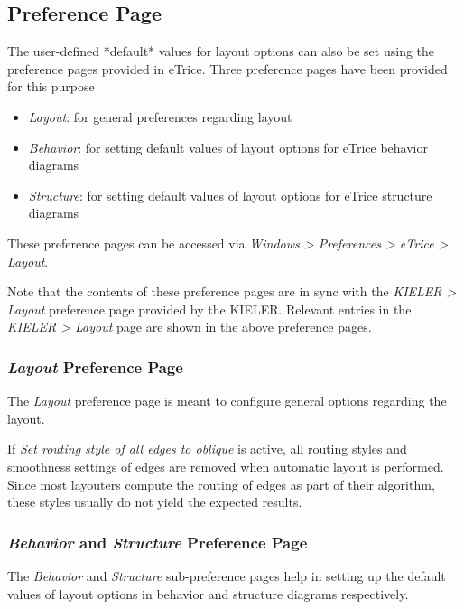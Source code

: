 \subsection{\label{preferencePage}Preference Page}

The user-defined *default* values for layout options can also be set using the preference pages provided in eTrice. Three preference pages have been provided for this purpose
\begin{itemize}
\item \textit{Layout}: for general preferences regarding layout
\item \textit{Behavior}: for setting default values of layout options for eTrice behavior diagrams
\item \textit{Structure}: for setting default values of layout options for eTrice structure diagrams
\end{itemize}

These preference pages can be accessed via \textit{Windows > Preferences > eTrice > Layout}.

Note that the contents of these preference pages are in sync with the \textit{KIELER > Layout} preference page provided by the KIELER. Relevant entries in the \textit{KIELER > Layout} page are shown in the above preference pages.

\subsubsection{\textit{Layout} Preference Page}

The \textit{Layout} preference page is meant to configure general options regarding the layout. 

If \textit{Set routing style of all edges to oblique} is active, all routing styles and smoothness settings of edges are removed when automatic layout is performed. Since most layouters compute the routing of edges as part of their algorithm, these styles usually do not yield the expected results.

\subsubsection{\textit{Behavior} and \textit{Structure} Preference Page}

The \textit{Behavior} and \textit{Structure} sub-preference pages help in setting up the default values of layout options in behavior and structure diagrams respectively.

